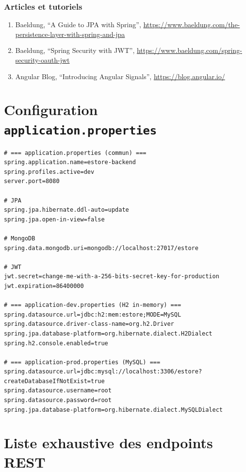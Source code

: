 \documentclass[11pt,a4paper,oneside]{report}
\begin{document}
\subsection*{Articles et tutoriels}

\begin{enumerate}
  \item Baeldung, ``A Guide to JPA with Spring'', \url{https://www.baeldung.com/the-persistence-layer-with-spring-and-jpa}
  \item Baeldung, ``Spring Security with JWT'', \url{https://www.baeldung.com/spring-security-oauth-jwt}
  \item Angular Blog, ``Introducing Angular Signals'', \url{https://blog.angular.io/}
\end{enumerate}

\appendix

\chapter{Configuration \texttt{application.properties}}

\begin{lstlisting}[style=propertiesstyle]
# === application.properties (commun) ===
spring.application.name=estore-backend
spring.profiles.active=dev
server.port=8080

# JPA
spring.jpa.hibernate.ddl-auto=update
spring.jpa.open-in-view=false

# MongoDB
spring.data.mongodb.uri=mongodb://localhost:27017/estore

# JWT
jwt.secret=change-me-with-a-256-bits-secret-key-for-production
jwt.expiration=86400000

# === application-dev.properties (H2 in-memory) ===
spring.datasource.url=jdbc:h2:mem:estore;MODE=MySQL
spring.datasource.driver-class-name=org.h2.Driver
spring.jpa.database-platform=org.hibernate.dialect.H2Dialect
spring.h2.console.enabled=true

# === application-prod.properties (MySQL) ===
spring.datasource.url=jdbc:mysql://localhost:3306/estore?createDatabaseIfNotExist=true
spring.datasource.username=root
spring.datasource.password=root
spring.jpa.database-platform=org.hibernate.dialect.MySQLDialect
\end{lstlisting}

\chapter{Liste exhaustive des endpoints REST}
\end{document}

